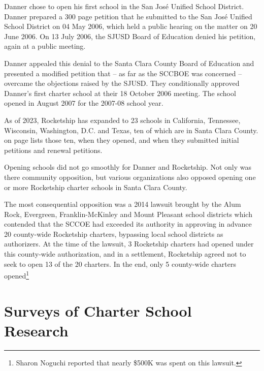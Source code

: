 Danner chose to open his first school in the San José Unified School District. Danner prepared a 300 page petition that he submitted to the San José Unified School District on 04 May 2006, which held a public hearing on the matter on 20 June 2006. On 13 July 2006, the SJUSD Board of Education denied his petition, again at a public meeting.

Danner appealed this denial to the Santa Clara County Board of Education and presented a modified petition that – as far as the SCCBOE was concerned – overcame the objections raised by the SJUSD. They conditionally approved Danner's first charter school at their 18 October 2006 meeting. The school opened in August 2007 for the 2007-08 school year.

As of 2023, Rocketship has expanded to 23 schools in California, Tennessee, Wisconsin, Washington, D.C. and Texas, ten of which are in Santa Clara County.  on page \pageref{tab:RocketshipSchools} lists those ten, when they opened, and when they submitted initial petitions and renewal petitions.

Opening schools did not go smoothly for Danner and Rocketship. Not only was there community opposition, but various organizations also opposed opening one or more Rocketship charter schools in Santa Clara County.

The most consequential opposition was a 2014 lawsuit brought by the Alum Rock, Evergreen, Franklin-McKinley and Mount Pleasant school districts which contended that the SCCOE had exceeded its authority in approving in advance 20 county-wide Rocketship charters, bypassing local school districts as authorizers. At the time of the lawsuit, 3 Rocketship charters had opened under this county-wide authorization, and in a settlement, Rocketship agreed not to seek to open 13 of the 20 charters. In the end, only 5 county-wide charters opened\footnote{Sharon Noguchi reported that nearly \$500K was spent on this lawsuit\parencite{Noguchi2015}.}

\section{Surveys of Charter School Research}\label{sec:charter-surveys}\indent

